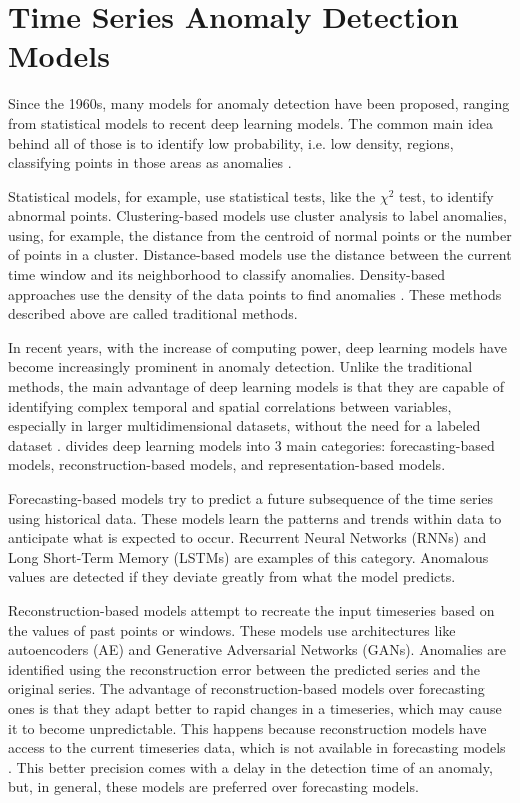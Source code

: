 \section{Time Series Anomaly Detection Models} \label{sec-model-basics}

Since the 1960s, many models for anomaly detection have been proposed, ranging from statistical models to recent deep learning models. The common main idea behind all of those is to identify low probability, i.e. low density, regions, classifying points in those areas as anomalies \cite{Samariya_Thakkar_2021}. 

Statistical models, for example, use statistical tests, like the $\chi ^2$ test, to identify abnormal points. Clustering-based models use cluster analysis to label anomalies, using, for example, the distance from the centroid of normal points or the number of points in a cluster. Distance-based models use the distance between the current time window and its neighborhood to classify anomalies. Density-based approaches use the density of the data points to find anomalies \cite{Zamanzadeh_Darban_Webb_Pan_Aggarwal_Salehi_2024, Samariya_Thakkar_2021}. These methods described above are called traditional methods.

In recent years, with the increase of computing power, deep learning models have become increasingly prominent in anomaly detection. Unlike the traditional methods, the main advantage of deep learning models is that they are capable of identifying complex temporal and spatial correlations between variables, especially in larger multidimensional datasets, without the need for a labeled dataset \cite{Zamanzadeh_Darban_Webb_Pan_Aggarwal_Salehi_2024, Choi_Yi_Park_Yoon_2021}. \cite{Zamanzadeh_Darban_Webb_Pan_Aggarwal_Salehi_2024} divides deep learning models into 3 main categories: forecasting-based models, reconstruction-based models, and representation-based models.

Forecasting-based models try to predict a future subsequence of the time series using historical data. These models learn the patterns and trends within data to anticipate what is expected to occur. Recurrent Neural Networks (RNNs) and Long Short-Term Memory (LSTMs) are examples of this category. Anomalous values are detected if they deviate greatly from what the model predicts.

Reconstruction-based models attempt to recreate the input timeseries based on the values of past points or windows. These models use architectures like autoencoders (AE) and Generative Adversarial Networks (GANs). Anomalies are identified using the reconstruction error between the predicted series and the original series. The advantage of reconstruction-based models over forecasting ones is that they adapt better to rapid changes in a timeseries, which may cause it to become unpredictable. This happens because reconstruction models have access to the current timeseries data, which is not available in forecasting models \cite{Zamanzadeh_Darban_Webb_Pan_Aggarwal_Salehi_2024}. This better precision comes with a delay in the detection time of an anomaly, but, in general, these models are preferred over forecasting models.

